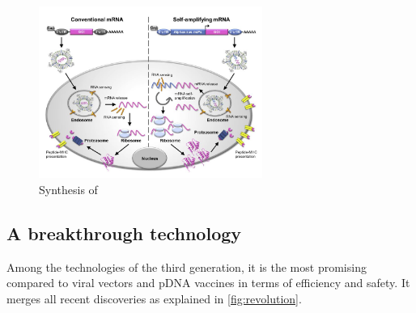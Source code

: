 \documentclass{article}
\begin{document}
            \begin{figure}
                \centering
                \includegraphics[width=0.65\textwidth]{imgs/mRNA_action.JPG}
                \caption{Synthesis of \autocite{MRNATransformativeTechnology}}
                \label{fig:mRNAtypesnext}
            \end{figure}


     
        \subsection{A breakthrough technology}

            Among the technologies of the third generation, it is the most promising compared to viral vectors and pDNA vaccines in terms of efficiency and safety.
            It merges all recent discoveries as explained in \ref{fig:revolution}.
            
\end{document}
